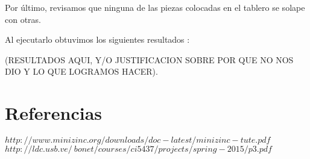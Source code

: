 \documentclass{article}
\begin{document}
Por último, revisamos que ninguna de las piezas colocadas en el tablero se solape con otras. \par


Al ejecutarlo obtuvimos los siguientes resultados : \par


(RESULTADOS AQUI, Y/O JUSTIFICACION SOBRE POR QUE NO NOS DIO Y LO QUE LOGRAMOS HACER).\par


\clearpage

\section{Referencias}


$http://www.minizinc.org/downloads/doc-latest/minizinc-tute.pdf$
$http://ldc.usb.ve/~bonet/courses/ci5437/projects/spring-2015/p3.pdf$
\end{document}
